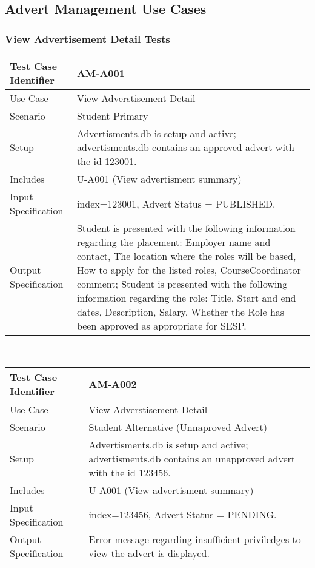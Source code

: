 \documentclass{l3deliverable}
\begin{document}
\subsection{Advert Management Use Cases}
\subsubsection{View Advertisement Detail Tests}

\begin{tabular}{lp{10cm}}
\hline 
\textbf{Test Case Identifier} & AM-A001\tabularnewline
\hline 
\hline 
Use Case & View Adverstisement Detail \tabularnewline
\hline 
Scenario & Student Primary \tabularnewline
\hline 
Setup & Advertisments.db is setup and active; advertisments.db contains an approved advert with the id 123001.\tabularnewline
\hline 
Includes & U-A001 (View advertisment summary) \tabularnewline
\hline 
Input Specification & index=123001, Advert Status = PUBLISHED. \tabularnewline
\hline 
Output Specification & Student is presented with the following information regarding the placement: Employer name and contact, The location where the roles will be based, How to apply for the listed roles, CourseCoordinator comment; Student is presented with the following information regarding the role: Title, Start and end dates, Description, Salary, Whether the Role has been approved as appropriate for SESP.\tabularnewline
\hline 
\end{tabular}\\

\begin{tabular}{lp{10cm}}
\hline 
\textbf{Test Case Identifier} & AM-A002\tabularnewline
\hline 
\hline 
Use Case & View Adverstisement Detail \tabularnewline
\hline 
Scenario & Student Alternative (Unnaproved Advert) \tabularnewline
\hline 
Setup & Advertisments.db is setup and active; advertisments.db contains an unapproved advert with the id 123456.\tabularnewline
\hline 
Includes & U-A001 (View advertisment summary) \tabularnewline
\hline 
Input Specification & index=123456, Advert Status = PENDING. \tabularnewline
\hline 
Output Specification &  Error message regarding insufficient priviledges to view the advert is displayed.\tabularnewline
\hline 
\end{tabular}\\
\end{document}
